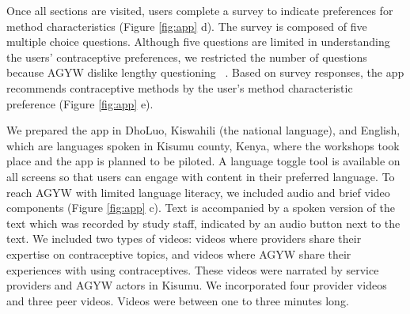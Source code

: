 Once all sections are visited, users complete a survey to indicate preferences for method characteristics (Figure \ref{fig:app} d). The survey is composed of five multiple choice questions. Although five questions are limited in understanding the users’ contraceptive preferences, we restricted the number of questions because AGYW dislike lengthy questioning ~\cite{gonsalves2020pharmacists}. Based on survey responses, the app recommends contraceptive methods by the user’s method characteristic preference (Figure \ref{fig:app} e). %

We prepared the  app in DhoLuo, Kiswahili (the national language), and English, which are languages spoken in Kisumu county, Kenya, where the workshops took place and the app is planned to be piloted. A language toggle tool is available on all screens so that users can engage with content in their preferred language. To reach AGYW with limited language literacy, we included audio and brief video components (Figure \ref{fig:app} c). Text is accompanied by a spoken version of the text which was recorded by study staff, indicated by an audio button next to the text. We included two types of videos: videos where providers share their expertise on contraceptive topics, and videos where AGYW share their experiences with using contraceptives. These videos were narrated by service providers and AGYW actors in Kisumu. We incorporated four provider videos and three peer videos. Videos were between one to three minutes long.
